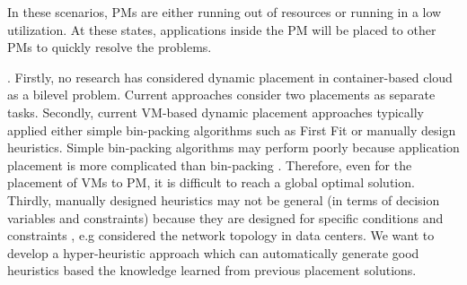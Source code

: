  In these scenarios, PMs are either running out of resources or running in a low utilization. At these states, applications inside the PM will be placed to other PMs to quickly resolve the problems.

. 
Firstly, no research has considered dynamic placement in container-based cloud as a bilevel problem. Current approaches \cite{Piraghaj:2016bw} consider two placements as separate tasks. 
Secondly, current VM-based dynamic placement approaches typically applied either simple bin-packing algorithms such as First Fit or manually design heuristics. Simple bin-packing algorithms may perform poorly because application placement is more complicated than bin-packing \cite{Mann:2015ua}. Therefore, even for the placement of VMs to PM, it is difficult to reach a global optimal solution. Thirdly, manually designed heuristics may not be general (in terms of decision variables and constraints) because they are designed for specific conditions and constraints \cite{Jung:2010dt}, e.g considered the network topology in data centers. We want to develop a hyper-heuristic approach which can automatically generate good heuristics based the knowledge learned from previous placement solutions.



